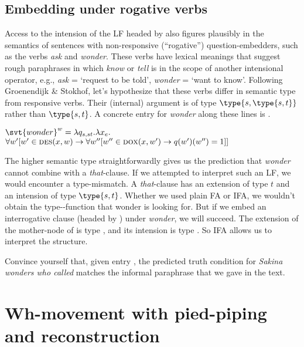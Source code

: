 \subsection{Embedding under rogative verbs}
\label{sec:embedding-rogative}

Access to the intension of the LF headed by \ans also figures plausibly in the
semantics of sentences with non-responsive (``rogative'') question-embedders,
such as the verbs \emph{ask} and \emph{wonder}. These verbs have lexical
meanings that suggest rough paraphrases in which \emph{know} or \emph{tell} is
in the scope of another intensional operator, e.g., \emph{ask} = `request to be
told', \emph{wonder} = `want to know'. Following Groenendijk \& Stokhof, let's
hypothesize that these verbs differ in semantic type from responsive verbs.
Their (internal) argument is of type $\type{s,\type{s,t}}$ rather than
$\type{s,t}$. A concrete entry for \emph{wonder} along these lines is \Next.

\ex
$\svt{wonder}^{w} = \lambda q_{s,st}.\lambda x_{e}.$\\
\hfill$\forall w' [w'\in\textsc{des}(x,w) \rightarrow \forall w'' [w''\in\textsc{dox}(x,w') \rightarrow q(w')(w'')=1]]$
\xe

The higher semantic type straightforwardly gives us the prediction that
\emph{wonder} cannot combine with a \emph{that}-clause. If we attempted to
interpret such an LF, we would encounter a type-mismatch. A \emph{that}-clause
has an extension of type $t$ and an intension of type $\type{s,t}$. Whether we
used plain FA or IFA, we wouldn't obtain the type--function that
wonder is looking for. But if we embed an interrogative clause (headed by \ans)
under \emph{wonder}, we will succeed. The extension of the mother-node of \ans
is type , and its intension is type . So IFA allows us to
interpret the structure.

\begin{exercise}
  Convince yourself that, given entry \Last, the predicted truth condition for
  \emph{Sakina wonders who called} matches the informal paraphrase that we gave
  in the text.
\end{exercise}

\section{Wh-movement with pied-piping and reconstruction}
\label{sec:pied-piping}

